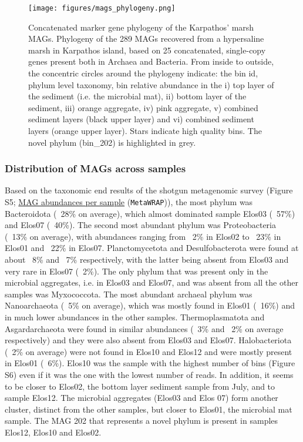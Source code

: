    \begin{figure}[!htbp]
      \centering
      \texttt{[image: figures/mags\_phylogeny.png]}
      \caption[Concatenated marker gene phylogeny of the Karpathos’ marsh MAGs]{
         Concatenated marker gene phylogeny of the Karpathos’ marsh MAGs. 
         Phylogeny of the 289 MAGs recovered from a hypersaline marsh in Karpathos island, based on 25 concatenated, single-copy genes present both in Archaea and Bacteria. 
         From inside to outside, the concentric circles around the phylogeny indicate: the bin id, phylum level taxonomy, bin relative abundance in the 
         i) top layer of the sediment (i.e. the microbial mat), 
         ii) bottom layer of the sediment, 
         iii) orange aggregate, 
         iv) pink aggregate, 
         v) combined sediment layers (black upper layer) and 
         vi) combined sediment layers (orange upper layer). 
         Stars indicate high quality bins. 
         The novel phylum (bin\_202) is highlighted in grey. 
      }
      \label{fig:mags-phylogeny}
   \end{figure}   


\subsubsection*{Distribution of MAGs across samples}

   Based on the taxonomic end results of the shotgun metagenomic survey 
   (Figure S5; \href{https://github.com/hariszaf/karpathos-swamp/blob/main/metaWRAP/QUANT_BINS/bin_abundance_table.tab}{MAG abundances per sample} (\texttt{MetaWRAP})), 
   the most phylum was Bacteroidota (~28\% on average), 
   which almost dominated sample Elos03 (~57\%) and Elos07 (~40\%). 
   The second most abundant phylum was Proteobacteria (~13\% on average), with abundances ranging from ~2\% in Elos02 to ~23\% in Elos01 and ~22\% in Elos07. 
   Planctomycetota and Desulfobacterota were found at about ~8\% and ~7\% respectively, with the latter being absent from Elos03 and very rare in Elos07 (~2\%). 
   The only phylum that was present only in the microbial aggregates, i.e. in Elos03 and Elos07, and was absent from all the other samples was Myxococcota.
   The most abundant archaeal phylum was Nanoarchaeota (~5\% on average), which was mostly found in Elos01 (~16\%) and in much lower abundances in the other samples. 
   Thermoplasmatota and Asgardarchaeota were found in similar abundances (~3\% and ~2\% on average respectively) and they were also absent from Elos03 and Elos07. 
   Halobacteriota (~2\% on average) were not found in Elos10 and Elos12 and were mostly present in Elos01 (~6\%). 
   Elos10 was the sample with the highest number of bins (Figure S6) even if it was the one with the lowest number of reads. 
   In addition, it seems to be closer to Elos02, the bottom layer sediment sample from July, and to sample Elos12. 
   The microbial aggregates (Elos03 and Elos 07) form another cluster, distinct from the other samples, but closer to Elos01, the microbial mat sample.  
   The MAG 202 that represents a novel phylum is present in samples Elos12, Elos10 and Elos02.


